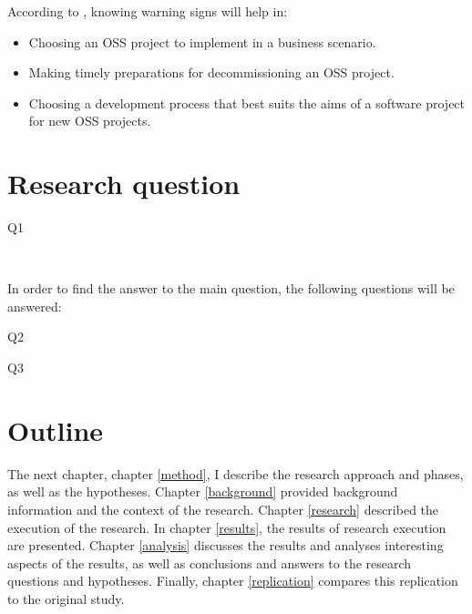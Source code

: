 \noindent
According to \citet{karus2013}, knowing warning signs will help in:
\begin{itemize}
	\item Choosing an OSS project to implement in a business scenario.
	\item Making timely preparations for decommissioning an OSS project.
	\item Choosing a development process that best suits the aims of a software
	project for new OSS projects.
\end{itemize}




\section{Research question}
\label{questions}

\begin{description}
	\item[Q1\label{itm:question_warningsigns}]
	\emph{\researchQuestion}\\[0.3cm]
\end{description}

\noindent
In order to find the answer to the main question, the following
questions will be answered:
\begin{description}
	\item[Q2\label{itm:question_patterns}] \emph{\subQuestionOne}
	\item[Q3\label{itm:question_successfailure}] \emph{\subQuestionTwo}
\end{description}


\section{Outline}

The next chapter, chapter \ref{method}, I describe the research approach and
phases, as well as the hypotheses. Chapter \ref{background} provided background
information and the context of the research. Chapter \ref{research} described
the execution of the research. In chapter \ref{results}, the results of research
execution are presented. Chapter \ref{analysis} discusses the results and
analyses interesting aspects of the results, as well as conclusions and answers
to the research questions and hypotheses.
Finally, chapter \ref{replication} compares this replication to the original
study.

